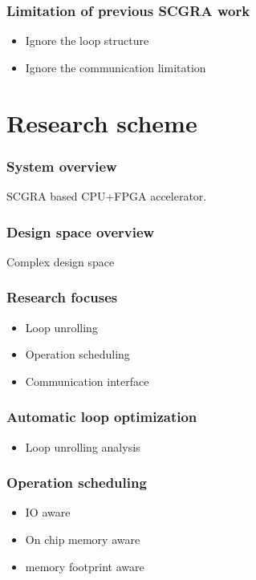 \documentclass{beamer}
\begin{document}
\begin{frame}

\frametitle{Limitation of previous SCGRA work}
\begin{itemize}
\item Ignore the loop structure
\item Ignore the communication limitation
\end{itemize}

\end{frame}

\section{Research scheme}
\begin{frame}

\frametitle{System overview}
SCGRA based CPU+FPGA accelerator.

\end{frame}

\begin{frame}
\frametitle{Design space overview}
Complex design space

\end{frame}

\begin{frame}

\frametitle{Research focuses}
\begin{itemize}
\item Loop unrolling
\item Operation scheduling
\item Communication interface
\end{itemize}

\end{frame}

\begin{frame}

\frametitle{Automatic loop optimization}
\begin{itemize}
\item Loop unrolling analysis
\end{itemize}

\end{frame}

\begin{frame}

\frametitle{Operation scheduling}
\begin{itemize}
\item IO aware
\item On chip memory aware
\item memory footprint aware
\end{itemize}

\end{frame}
\end{document}
